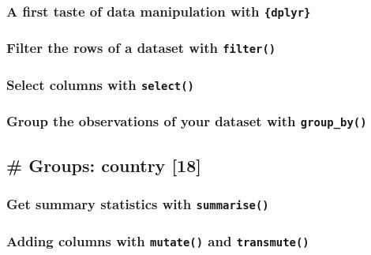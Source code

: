 \documentclass[]{gitbook}
\begin{document}
\hypertarget{a-first-taste-of-data-manipulation-with-dplyr}{%
\subsubsection{\texorpdfstring{A first taste of data manipulation with \texttt{\{dplyr\}}}{A first taste of data manipulation with \{dplyr\}}}\label{a-first-taste-of-data-manipulation-with-dplyr}}

\hypertarget{filter-the-rows-of-a-dataset-with-filter}{%
\subsubsection{\texorpdfstring{Filter the rows of a dataset with \texttt{filter()}}{Filter the rows of a dataset with filter()}}\label{filter-the-rows-of-a-dataset-with-filter}}

\hypertarget{select-columns-with-select}{%
\subsubsection{\texorpdfstring{Select columns with \texttt{select()}}{Select columns with select()}}\label{select-columns-with-select}}

\hypertarget{group-the-observations-of-your-dataset-with-group_by}{%
\subsubsection{\texorpdfstring{Group the observations of your dataset with \texttt{group\_by()}}{Group the observations of your dataset with group\_by()}}\label{group-the-observations-of-your-dataset-with-group_by}}

\hypertarget{groups-country-18}{%
\subsection{\# Groups: country {[}18{]}}\label{groups-country-18}}

\hypertarget{get-summary-statistics-with-summarise}{%
\subsubsection{\texorpdfstring{Get summary statistics with \texttt{summarise()}}{Get summary statistics with summarise()}}\label{get-summary-statistics-with-summarise}}

\hypertarget{adding-columns-with-mutate-and-transmute}{%
\subsubsection{\texorpdfstring{Adding columns with \texttt{mutate()} and \texttt{transmute()}}{Adding columns with mutate() and transmute()}}\label{adding-columns-with-mutate-and-transmute}}
\end{document}
